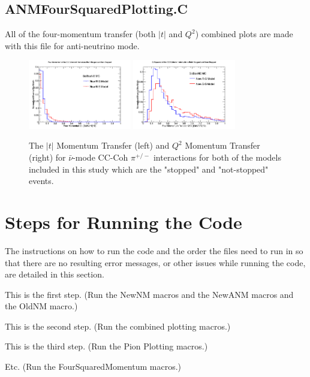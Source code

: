 \documentclass[11pt]{article}
\begin{document}
\subsection{ANMFourSquaredPlotting.C}
All of the four-momentum transfer (both $|t|$ and $Q^2$) combined plots are made with this file for anti-neutrino mode.

\begin{figure}[H]
\centering
\includegraphics[width=0.4\textwidth]{CCCohPlots/ANMCCCohGoodT.png}
\includegraphics[width=0.4\textwidth]{CCCohPlots/ANMCCCohGoodQ2.png}
\caption{The $|t|$ Momentum Transfer (left) and $Q^2$ Momentum Transfer (right) for $\bar{\nu}$-mode CC-Coh $\pi^{+/-}$ interactions for both of the models included in this study which are the "stopped" and "not-stopped" events.}
\end{figure}



\section{Steps for Running the Code}
The instructions on how to run the code and the order the files need to run in so that there are no resulting error messages, or other issues while running the code, are detailed in this section.

\begin{adjustwidth}{4.0em}{0pt}
\begin{steps}
  \item This is the first step. (Run the NewNM macros and the NewANM macros and the OldNM macro.)
  \item This is the second step. (Run the combined plotting macros.)
  \item This is the third step. (Run the Pion Plotting macros.)
  \item Etc. (Run the FourSquaredMomentum macros.)
\end{steps}
\end{adjustwidth}
\end{document}
